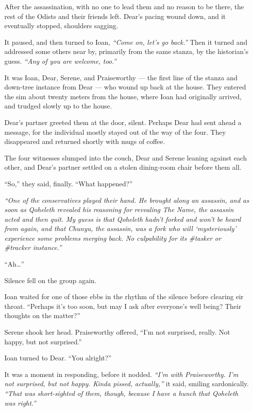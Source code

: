 After the assassination, with no one to lead them and no reason to be there, the rest of the Odists and their friends left. Dear's pacing wound down, and it eventually stopped, shoulders sagging.

It paused, and then turned to Ioan, \emph{``Come on, let's go back.''} Then it turned and addressed some others near by, primarily from the same stanza, by the historian's guess. \emph{``Any of you are welcome, too.''}

It was Ioan, Dear, Serene, and Praiseworthy --- the first line of the stanza and down-tree instance from Dear --- who wound up back at the house. They entered the sim about twenty meters from the house, where Ioan had originally arrived, and trudged slowly up to the house.

Dear's partner greeted them at the door, silent. Perhaps Dear had sent ahead a message, for the individual mostly stayed out of the way of the four. They disappeared and returned shortly with mugs of coffee.

The four witnesses slumped into the couch, Dear and Serene leaning against each other, and Dear's partner settled on a stolen dining-room chair before them all.

``So,'' they said, finally. ``What happened?''

\emph{``One of the conservatives played their hand. He brought along an assassin, and as soon as Qoheleth revealed his reasoning for revealing The Name, the assassin acted and then quit. My guess is that Qoheleth hadn't forked and won't be heard from again, and that Chunyu, the assassin, was a fork who will `mysteriously' experience some problems merging back. No culpability for its \#tasker or \#tracker instance.''}

``Ah\ldots{}''

Silence fell on the group again.

Ioan waited for one of those ebbs in the rhythm of the silence before clearing eir throat. ``Perhaps it's too soon, but may I ask after everyone's well being? Their thoughts on the matter?''

Serene shook her head. Praiseworthy offered, ``I'm not surprised, really. Not happy, but not surprised.''

Ioan turned to Dear. ``You alright?''

It was a moment in responding, before it nodded. \emph{``I'm with Praiseworthy. I'm not surprised, but not happy. Kinda pissed, actually,''} it said, smiling sardonically. \emph{``That was short-sighted of them, though, because I have a hunch that Qoheleth was right.''}

